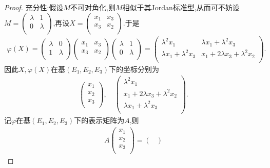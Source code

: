 \documentclass[../../main.tex]{subfiles}%
\begin{document}
\begin{proof}
{\heiti 充分性:}假设$M$不可对角化,则$M$相似于其Jordan标准型,从而可不妨设$M=\begin{pmatrix}
\lambda&		1\\
0&		\lambda\\
\end{pmatrix}$,再设$X=\begin{pmatrix}
x_1&		x_3\\
x_3&		x_2\\
\end{pmatrix}$.于是
\begin{align*}
\varphi(X)=\begin{pmatrix}
\lambda&		0\\
1&		\lambda\\
\end{pmatrix}\begin{pmatrix}
x_1&		x_3\\
x_3&		x_2\\
\end{pmatrix}\begin{pmatrix}
\lambda&		1\\
0&		\lambda\\
\end{pmatrix}=\begin{pmatrix}
\lambda^2x_1&		\lambda x_1+\lambda^2x_3\\
\lambda x_1+\lambda^2x_3&		x_1+2\lambda x_3+\lambda^2x_2\\
\end{pmatrix}.
\end{align*}
因此$X,\varphi(X)$在基$(E_1,E_2,E_3)$下的坐标分别为
\begin{align*}
\begin{pmatrix}
x_1\\
x_2\\
x_3\\
\end{pmatrix},\quad\begin{pmatrix}
\lambda^2x_1\\
x_1+2\lambda x_3+\lambda^2x_2\\
\lambda x_1+\lambda^2x_3\\
\end{pmatrix}.
\end{align*}
记$\varphi$在基$(E_1,E_2,E_3)$下的表示矩阵为$A$,则
\begin{align*}
A\begin{pmatrix}
x_1\\
x_2\\
x_3\\
\end{pmatrix}=\begin{pmatrix}

\end{pmatrix}
\end{align*}
\end{proof}
\end{document}
